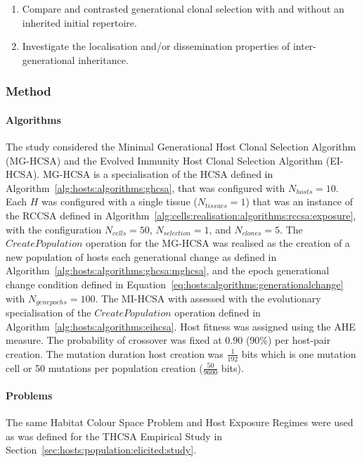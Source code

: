 \begin{enumerate}
	\item Compare and contrasted generational clonal selection with and without an inherited initial repertoire.
	\item Investigate the localisation and/or dissemination properties of inter-generational inheritance.
\end{enumerate}


%
%
\subsubsection{Method}

%
%
\paragraph{Algorithms}
The study considered the Minimal Generational Host Clonal Selection Algorithm (MG-HCSA) and the Evolved Immunity Host Clonal Selection Algorithm (EI-HCSA).
MG-HCSA is a specialisation of the HCSA defined in Algorithm~\ref{alg:hosts:algorithms:ghcsa}, that was configured with $N_{hosts}=10$. Each $H$ was configured with a single tissue ($N_{tissues}=1$) that was an instance of the RCCSA defined in Algorithm~\ref{alg:cells:realisation:algorithms:rccsa:exposure}, with the configuration $N_{cells}=50$, $N_{selection}=1$, and $N_{clones}=5$. The $CreatePopulation$ operation for the MG-HCSA was realised as the creation of a new population of hosts each generational change as defined in Algorithm~\ref{alg:hosts:algorithms:ghcsa:mghcsa}, and the epoch generational change condition defined in Equation~\ref{eq:hosts:algorithms:generationalchange} with $N_{genepochs}=100$.
The MI-HCSA with assessed with the evolutionary specialisation of the $CreatePopulation$ operation defined in Algorithm~\ref{alg:hosts:algorithms:eihcsa}. Host fitness was assigned using the AHE measure. The probability of crossover was fixed at 0.90 (90\%) per host-pair creation. The mutation duration host creation was $\frac{1}{192}$ bits which is one mutation cell or 50 mutations per population creation ($\frac{50}{9600}$ bits). 

%
%
\paragraph{Problems}
The same Habitat Colour Space Problem and Host Exposure Regimes were used as was defined for the THCSA Empirical Study in Section~\ref{sec:hosts:population:elicited:study}.

